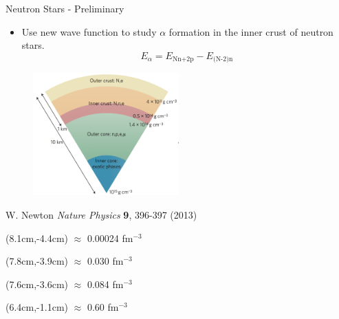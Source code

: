 \documentclass{beamer}
\begin{document}
\begin{frame}{Neutron Stars - Preliminary}
\begin{itemize}
   \item Use new wave function to study $\alpha$ formation in the inner crust of neutron stars.
   \begin{equation*}
      E_\alpha = E_\text{Nn+2p} - E_\text{(N-2)n}
   \end{equation*}
\end{itemize}
\vspace{-0.5cm}
\begin{figure}[h]
   \centering
   \includegraphics[width=0.5\textwidth]{neutronstar.png}
\end{figure}
W. Newton {\it Nature Physics} {\bf 9}, 396-397 (2013)
\begin{textblock*}{\textwidth}(8.1cm,-4.4cm) %
   \tiny $\approx$ 0.00024 fm$^{-3}$
\end{textblock*}
\begin{textblock*}{\textwidth}(7.8cm,-3.9cm) %
   \tiny $\approx$ 0.030 fm$^{-3}$
\end{textblock*}
\begin{textblock*}{\textwidth}(7.6cm,-3.6cm) %
   \tiny $\approx$ 0.084 fm$^{-3}$
\end{textblock*}
\begin{textblock*}{\textwidth}(6.4cm,-1.1cm) %
   \tiny $\approx$ 0.60 fm$^{-3}$
\end{textblock*}
\end{frame}
\end{document}
